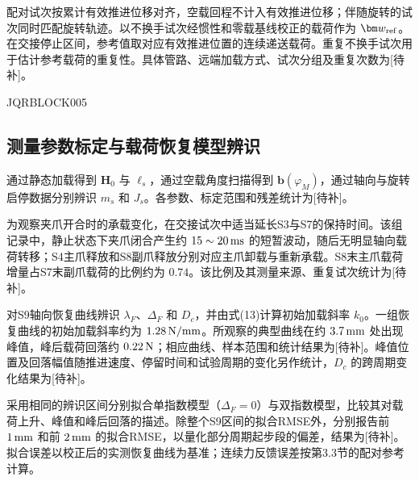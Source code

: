 配对试次按累计有效推进位移对齐，空载回程不计入有效推进位移；伴随旋转的试次同时匹配旋转轨迹。以不换手试次经惯性和零载基线校正的载荷作为 $\bm w_{\rm ref}$。在交接停止区间，参考值取对应有效推进位置的连续递送载荷。重复不换手试次用于估计参考载荷的重复性。具体管路、远端加载方式、试次分组及重复次数为[待补]。







JQRBLOCK005







\subsection{测量参数标定与载荷恢复模型辨识}





通过静态加载得到 $\bm H_0$ 与 $\ell_s$，通过空载角度扫描得到 $\bm b(\varphi_M)$，通过轴向与旋转启停数据分别辨识 $m_s$ 和 $J_s$。各参数、标定范围和残差统计为[待补]。





为观察夹爪开合时的承载变化，在交接试次中适当延长S3与S7的保持时间。该组记录中，静止状态下夹爪闭合产生约 $15\sim20\,{\rm ms}$ 的短暂波动，随后无明显轴向载荷转移；S4主爪释放和S8副爪释放分别对应主爪卸载与重新承载。S8末主爪载荷增量占S7末副爪载荷的比例约为 $0.74$。该比例及其测量来源、重复试次统计为[待补]。





对S9轴向恢复曲线辨识 $\lambda_F$、$\Delta_F$ 和 $D_c$，并由式(13)计算初始加载斜率 $k_0$。一组恢复曲线的初始加载斜率约为 $1.28\,{\rm N/mm}$。所观察的典型曲线在约 $3.7\,{\rm mm}$ 处出现峰值，峰后载荷回落约 $0.22\,{\rm N}$；相应曲线、样本范围和统计结果为[待补]。峰值位置及回落幅值随推进速度、停留时间和试验周期的变化另作统计，$D_c$ 的跨周期变化结果为[待补]。





采用相同的辨识区间分别拟合单指数模型（$\Delta_F=0$）与双指数模型，比较其对载荷上升、峰值和峰后回落的描述。除整个S9区间的拟合RMSE外，分别报告前 $1\,{\rm mm}$ 和前 $2\,{\rm mm}$ 的拟合RMSE，以量化部分周期起步段的偏差，结果为[待补]。拟合误差以校正后的实测恢复曲线为基准；连续力反馈误差按第3.3节的配对参考计算。






